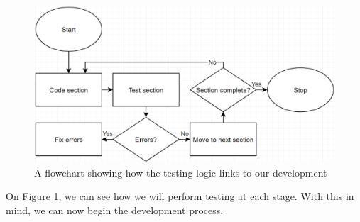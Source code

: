 \documentclass[9pt]{article}
\begin{document}
\begin{figure}[H]
	\centering
	\includegraphics[width=6in]{flowTesting.png}
	\caption{A flowchart showing how the testing logic links to our development}\label{fig_flowTesting}
\end{figure}
On Figure \ref{fig_flowTesting}, we can see how we will perform testing at each stage. With this in mind, we can now begin the development process.
\newpage
\end{document}
